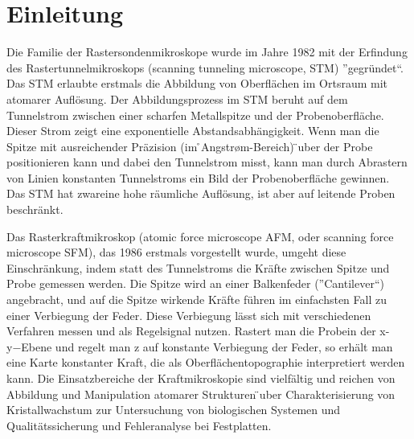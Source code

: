 \chapter{Einleitung}

Die Familie der Rastersondenmikroskope wurde im Jahre 1982 mit der Erfindung des Rastertunnelmikroskops (scanning tunneling microscope, STM) ”gegründet“.
Das STM erlaubte erstmals die Abbildung von Oberflächen im Ortsraum mit atomarer Auflösung.
Der Abbildungsprozess im STM beruht auf dem Tunnelstrom zwischen einer scharfen Metallspitze und der Probenoberfläche. 
Dieser Strom zeigt eine exponentielle Abstandsabhängigkeit. 
Wenn man die Spitze mit ausreichender Präzision (im ̊Angstrøm-Bereich) ̈uber der Probe positionieren kann und dabei den Tunnelstrom misst, kann man durch Abrastern von Linien konstanten Tunnelstroms ein Bild der Probenoberfläche gewinnen. 
Das STM hat zwareine hohe räumliche Auflösung, ist aber auf leitende Proben beschränkt.

Das Rasterkraftmikroskop (atomic force microscope AFM, oder scanning force microscope SFM), das 1986 erstmals vorgestellt wurde, umgeht diese Einschränkung, indem statt des Tunnelstroms die Kräfte zwischen Spitze und Probe gemessen werden. 
Die Spitze wird an einer Balkenfeder (”Cantilever“) angebracht, und auf die Spitze wirkende Kräfte führen im einfachsten Fall zu einer Verbiegung der Feder. Diese Verbiegung lässt sich mit verschiedenen  Verfahren  messen  und  als  Regelsignal  nutzen.
Rastert  man  die  Probein  der x-y−Ebene  und  regelt  man z auf  konstante  Verbiegung  der  Feder, so erhält man eine Karte konstanter Kraft, die als Oberflächentopographie interpretiert werden kann.
Die Einsatzbereiche der Kraftmikroskopie sind vielfältig und reichen von Abbildung  und  Manipulation  atomarer  Strukturen ̈uber  Charakterisierung von Kristallwachstum zur Untersuchung von biologischen Systemen und Qualitätssicherung und Fehleranalyse bei Festplatten.
